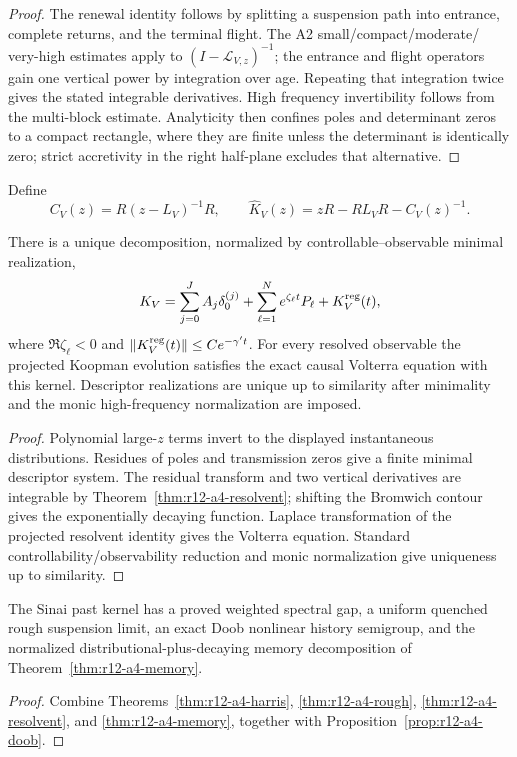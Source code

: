\begin{proof}
The renewal identity follows by splitting a suspension path into entrance,
complete returns, and the terminal flight.  The A2 small/compact/moderate/
very-high estimates apply to $(I-\mathcal L_{V,z})^{-1}$; the entrance and
flight operators gain one vertical power by integration over age.  Repeating
that integration twice gives the stated integrable derivatives.  High
frequency invertibility follows from the multi-block estimate.  Analyticity
then confines poles and determinant zeros to a compact rectangle, where they
are finite unless the determinant is identically zero; strict accretivity in
the right half-plane excludes that alternative.
\end{proof}

Define
\[
 C_V(z)=R(z-L_V)^{-1}R,
 \qquad
 \widehat K_V(z)=zR-RL_VR-C_V(z)^{-1}.
\]

\begin{theorem}
\label{thm:r12-a4-memory}
There is a unique decomposition, normalized by controllable--observable
minimal realization,
\[
 K_V=\sum_{j=0}^{J}A_j\delta_0^{(j)}
    +\sum_{\ell=1}^{N}e^{\zeta_\ell t}P_\ell
    +K_V^{\rm reg}(t),
\]
where $\Re\zeta_\ell<0$ and
$\|K_V^{\rm reg}(t)\|\le Ce^{-\gamma' t}$.  For every resolved observable the
projected Koopman evolution satisfies the exact causal Volterra equation with
this kernel.  Descriptor realizations are unique up to similarity after
minimality and the monic high-frequency normalization are imposed.
\end{theorem}

\begin{proof}
Polynomial large-$z$ terms invert to the displayed instantaneous
distributions.  Residues of poles and transmission zeros give a finite
minimal descriptor system.  The residual transform and two vertical
derivatives are integrable by Theorem~\ref{thm:r12-a4-resolvent}; shifting the
Bromwich contour gives the exponentially decaying function.  Laplace
transformation of the projected resolvent identity gives the Volterra
equation.  Standard controllability/observability reduction and monic
normalization give uniqueness up to similarity.
\end{proof}

\begin{theorem}
\label{thm:r12-a4-main}
The Sinai past kernel has a proved weighted spectral gap, a uniform quenched
rough suspension limit, an exact Doob nonlinear history semigroup, and the
normalized distributional-plus-decaying memory decomposition of
Theorem~\ref{thm:r12-a4-memory}.
\end{theorem}

\begin{proof}
Combine Theorems~\ref{thm:r12-a4-harris},
\ref{thm:r12-a4-rough}, \ref{thm:r12-a4-resolvent}, and
\ref{thm:r12-a4-memory}, together with Proposition~\ref{prop:r12-a4-doob}.
\end{proof}
